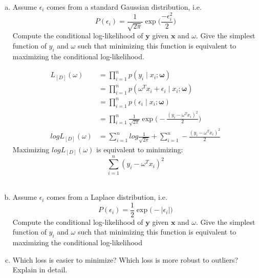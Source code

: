 \documentclass[11pt]{article}
\renewcommand{\vec}[1]{\mathbf{#1}}
\begin{document}
\begin{enumerate}[(a)]
\item Assume $\epsilon_i$ comes from a standard Gaussian distribution, i.e.
$$P(\epsilon_i) =  \frac{1}{\sqrt{2\pi}}\exp{\Big(\frac{-\epsilon_i^2}{2}\Big)}$$
Compute the conditional log-likelihood of $\textbf{y}$ given $\textbf{x}$ and $\omega$.  Give the simplest function of $y_i$ and $\omega$ such that minimizing this function is equivalent to maximizing the conditional log-likelihood. \\
\begin{answertext}{11cm}{}
\begin{align}
L_{[D]}(\omega) &= \prod_{i=1}^n p(y_i \mid x_i; \vec{\omega}) \\
&= \prod_{i=1}^n p(\omega^Tx_i + \epsilon_i \mid x_i; \vec{\omega}) \\
&= \prod_{i=1}^n p(\epsilon_i \mid x_i; \vec{\omega}) \\
&= \prod_{i=1}^n \frac{1}{\sqrt{2\pi}}\exp{\Big(-\frac{(y_i-\omega^Tx_i)^2}{2}\Big)} \\
logL_{[D]}(\omega) &=\sum_{i=1}^n log \frac{1}{\sqrt{2\pi}} + \sum_{i=1}^n -\frac{(y_i-\omega^Tx_i)^2}{2} 
\end{align}
Maximizing $logL_{[D]}(\omega)$ is equivalent to minimizing: \\
$$\sum_{i=1}^n  (y_i-\omega^Tx_i)^2$$\\
\end{answertext} 

\item Assume $\epsilon_i$ comes from a Laplace distribution, i.e.
$$P(\epsilon_i) =  \frac{1}{2}\exp{\Big(-|\epsilon_i|\Big)}$$
Compute the conditional log-likelihood of $\textbf{y}$ given $\textbf{x}$ and $\omega$.
Give the simplest function of $y_i$ and $\omega$ such that minimizing this function is equivalent to maximizing the conditional log-likelihood \\
\begin{answertext}{9cm}{}



\end{answertext} 

\item Which loss is easier to minimize?  Which loss is more robust to outliers?  Explain in detail.\\
\begin{answertext}{9cm}{}


  
\end{answertext} 

\end{enumerate}
\end{document}
